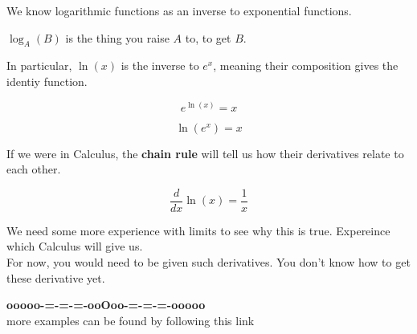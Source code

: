 \documentclass{ximera}
\begin{document}
\begin{idea}


We know logarithmic functions as an inverse to exponential functions. 



\begin{center}


$\log_A(B)$ is the thing you raise $A$ to, to get $B$. \\


\end{center}

In particular, $\ln(x)$ is the inverse to $e^x$, meaning their composition gives the identiy function.



\[
e^{\ln(x)} = x
\]


\[
\ln\left( e^x \right) = x
\]

If we were in Calculus, the \textbf{chain rule} will tell us how their derivatives relate to each other.




\[
\frac{d}{dx} \ln(x) = \frac{1}{x}
\]



\end{idea}


We need some more experience with limits to see why this is true. Expereince which Calculus will give us. \\


For now, you would need to be given such derivatives.  You don't know how to get these derivative yet.











\begin{center}
\textbf{\textcolor{green!50!black}{ooooo-=-=-=-ooOoo-=-=-=-ooooo}} \\

more examples can be found by following this link\\ 

\end{center}
\end{document}
